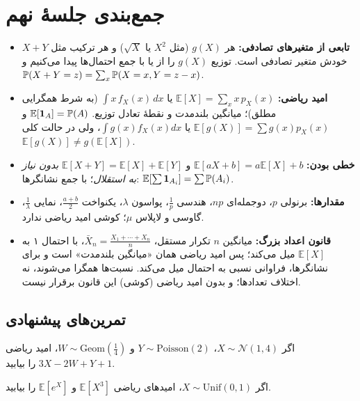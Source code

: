 \section*{جمع‌بندی جلسهٔ نهم}

\begin{summary}
  \begin{itemize}
    \item \textbf{تابعی از متغیرهای تصادفی:} هر $g(X)$ (مثل $X^2$ یا $\sqrt X$) و هر ترکیب مثل $X+Y$ خودش متغیر تصادفی است. توزیع $g(X)$ را از  یا با جمع احتمال‌ها پیدا می‌کنیم و $\P(X+Y=z)=\sum_x\P(X=x,Y=z-x)$.
    \item \textbf{امید ریاضی:} $\mathbb E[X]=\sum_xx\,p_X(x)$ یا $\int x\,f_X(x)\,dx$ (به شرط همگرایی مطلق)؛ میانگین بلندمدت و نقطهٔ تعادل توزیع. $\mathbb E[\ind_A]=\P(A)$ و $\mathbb E[g(X)]=\sum g(x)p_X(x)$ یا $\int g(x)f_X(x)dx$، ولی در حالت کلی $\mathbb E[g(X)]\ne g(\mathbb E[X])$.
    \item \textbf{خطی بودن:} $\mathbb E[aX+b]=a\mathbb E[X]+b$ و $\mathbb E[X+Y]=\mathbb E[X]+\mathbb E[Y]$ \emph{بدون نیاز به استقلال}؛ با جمع نشانگرها: $\mathbb E[\sum\ind_{A_i}]=\sum\P(A_i)$.
    \item \textbf{مقدارها:} برنولی $p$، دوجمله‌ای $np$، هندسی $\frac1p$، پواسون $\lambda$، یکنواخت $\frac{a+b}2$، نمایی $\frac1\lambda$، گاوسی و لاپلاس $\mu$؛ کوشی امید ریاضی ندارد.
    \item \textbf{قانون اعداد بزرگ:} میانگین $n$ تکرار مستقل، $\bar X_n=\frac{X_1+\cdots+X_n}{n}$، با احتمال ۱ به $\mathbb E[X]$ میل می‌کند؛ پس امید ریاضی همان «میانگین بلندمدت» است و برای نشانگرها، فراوانی نسبی به احتمال میل می‌کند. نسبت‌ها همگرا می‌شوند، نه اختلاف تعدادها؛ و بدون امید ریاضی (کوشی) این قانون برقرار نیست.
  \end{itemize}
\end{summary}

\subsection*{تمرین‌های پیشنهادی}

\begin{exercise}
  اگر $X\sim\mathcal N(1,4)$، $Y\sim\mathrm{Poisson}(2)$ و $W\sim\mathrm{Geom}(\tfrac14)$، امید ریاضی $3X-2W+Y+1$ را بیابید.
\end{exercise}

\begin{exercise}
  اگر $X\sim\mathrm{Unif}(0,1)$، امیدهای ریاضی $\mathbb E[X^3]$ و $\mathbb E[e^X]$ را بیابید.
\end{exercise}

